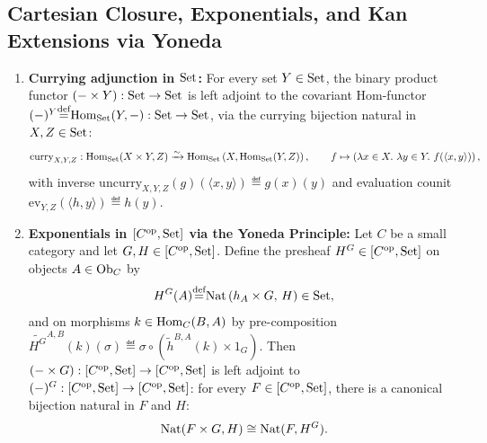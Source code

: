 \documentclass[10pt,a4paper]{article}
\begin{document}
\subsection{Cartesian Closure, Exponentials, and Kan Extensions via Yoneda}
\begin{theorem}\label{thm:cartesian_closed}
\begin{enumerate}
\item \textbf{Currying adjunction in ${\textrm{Set}}$:} For every set $Y \in {\textrm{Set}}$, the binary product functor $(- \times Y) : {\textrm{Set}} \to {\textrm{Set}}$ is left adjoint to the covariant Hom-functor $(-)^Y {\stackrel{{\textrm{def}}}{=}} {\textrm{Hom}}_{\textrm{Set}}(Y, -) : {\textrm{Set}} \to {\textrm{Set}}$, via the currying bijection natural in $X, Z \in {\textrm{Set}}$:
$$\mathrm{curry}_{X,Y,Z} : {\textrm{Hom}}_{\textrm{Set}}(X \times Y, Z) \xrightarrow{\sim} {\textrm{Hom}}_{\textrm{Set}}\left(X, {\textrm{Hom}}_{\textrm{Set}}(Y, Z)\right), \qquad f \mapsto \left(\lambda x \in X.\ \lambda y \in Y.\ f(\langle x, y \rangle)\right),$$
with inverse $\mathrm{uncurry}_{X,Y,Z}(g)(\langle x, y \rangle) \eqdef g(x)(y)$ and evaluation counit $\mathrm{ev}_{Y,Z}(\langle h, y \rangle) \eqdef h(y)$.
\item \textbf{Exponentials in $[C^{\textrm{op}}, {\textrm{Set}}]$ via the Yoneda Principle:} Let $C$ be a small category and let $G, H \in [C^{\textrm{op}}, {\textrm{Set}}]$. Define the presheaf $H^G \in [C^{\textrm{op}}, {\textrm{Set}}]$ on objects $A \in {\textrm{Ob}}_C$ by
$$H^G(A) {\stackrel{{\textrm{def}}}{=}} {\textrm{Nat}}\left(h_A \times G,\, H\right) \in {\textrm{Set}},$$
and on morphisms $k \in {\textrm{Hom}}_C(B, A)$ by pre-composition $\widetilde{H^G}^{A,B}(k)(\sigma) \eqdef \sigma \circ (\widetilde{h}^{B,A}(k) \times 1_G)$. Then $(- \times G) : [C^{\textrm{op}}, {\textrm{Set}}] \to [C^{\textrm{op}}, {\textrm{Set}}]$ is left adjoint to $(-)^G : [C^{\textrm{op}}, {\textrm{Set}}] \to [C^{\textrm{op}}, {\textrm{Set}}]$: for every $F \in [C^{\textrm{op}}, {\textrm{Set}}]$, there is a canonical bijection natural in $F$ and $H$:
$${\textrm{Nat}}(F \times G, H) \cong {\textrm{Nat}}(F, H^G).$$
\end{enumerate}
\end{theorem}
\myprf
\end{document}
